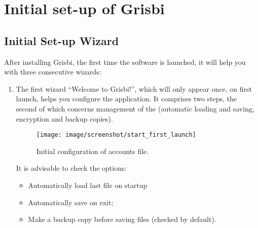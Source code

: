 

\chapter{Initial set-up of Grisbi\label{start}}


\section{Initial Set-up Wizard\label{start-first}}


After installing Grisbi, the first time the software is launched, it will help you with three consecutive wizards:

\begin{enumerate}
	\item The first wizard \enquote{Welcome to Grisbi!}, which will only appear once, on first launch, helps you configure the application. It comprises two steps, the second of which concerns management of the  (automatic loading and saving, encryption and backup copies).

\begin{figure}[htbp]
	\begin{center}
		\texttt{[image: image/screenshot/start\_first\_launch]}
	\end{center}
	\caption{Initial configuration of accounts file.}
	\label{start_first_launch}
\end{figure}

It is advisable to check the options:
	\begin{itemize}
		\item Automatically load last file on startup%
		\item Automatically save on exit;%
		\item Make a backup copy before saving files (checked by default).%
	\end{itemize}
\end{enumerate}

